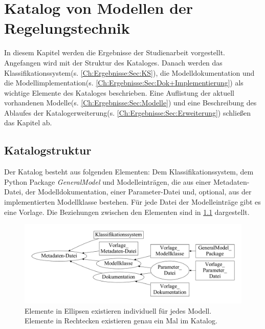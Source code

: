 \chapter{Katalog von Modellen der Regelungstechnik}
\label{Ch:Ergebnisse}
In diesem Kapitel werden die Ergebnisse der Studienarbeit vorgestellt. Angefangen wird mit der Struktur des Kataloges. Danach werden das Klassifikationssystem(s. \ref{Ch:Ergebnisse:Sec:KS}), die Modelldokumentation und die Modellimplementation(s. \ref{Ch:Ergebnisse:Sec:Dok+Implementierung}) als wichtige Elemente des Kataloges beschrieben. Eine Auflistung der aktuell vorhandenen Modelle(s. \ref{Ch:Ergebnisse:Sec:Modelle}) und eine Beschreibung des Ablaufes der Katalogerweiterung(s. \ref{Ch:Ergebnisse:Sec:Erweiterung}) schließen das Kapitel ab.
\section{Katalogstruktur}
\label{Ch:Ergebnisse:Sec:Struktur}
Der Katalog besteht aus folgenden Elementen: Dem Klassifikationssystem, dem Python Package \textit{GeneralModel} und Modelleinträgen, die aus einer Metadaten-Datei, der Modelldokumentation, einer Parameter-Datei und, optional, aus der implementierten Modellklasse bestehen. Für jede Datei der Modelleinträge gibt es eine Vorlage. Die Beziehungen zwischen den Elementen sind in \ref{fig:katalogstruktur} dargestellt.

\begin{figure}
	\centering
	\includegraphics[width=1\linewidth]{Katalogstruktur}
	\caption[Katalogstruktur]{Elemente in Ellipsen existieren individuell für jedes Modell. Elemente in Rechtecken existieren genau ein Mal im Katalog.}
	\label{fig:katalogstruktur}
\end{figure}



